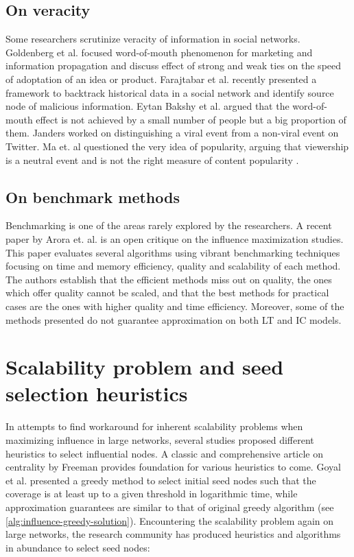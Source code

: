 		\subsection{On veracity}
		Some researchers scrutinize veracity of information in social networks. Goldenberg et al. \cite{goldenberg2001} focused word-of-mouth phenomenon for marketing and information propagation and discuss effect of strong and weak ties on the speed of adoptation of an idea or product. Farajtabar et al. \cite{farajtabar2015} recently presented a framework to backtrack historical data in a social network and identify source node of malicious information. Eytan Bakshy et al. \cite{bakshy2011} argued that the word-of-mouth effect is not achieved by a small number of people but a big proportion of them. Janders \cite{jenders2013} worked on distinguishing a viral event from a non-viral event on Twitter. Ma et. al questioned the very idea of popularity, arguing that viewership is a neutral event and is not the right measure of content popularity \cite{ma2013}.

		\subsection{On benchmark methods}
		Benchmarking is one of the areas rarely explored by the researchers. A recent paper by Arora et. al. \cite{arora2017} is an open critique on the influence maximization studies. This paper evaluates several algorithms using vibrant benchmarking techniques focusing on time and memory efficiency, quality and scalability of each method. The authors establish that the efficient methods miss out on quality, the ones which offer quality cannot be scaled, and that the best methods for practical cases are the ones with higher quality and time efficiency. Moreover, some of the methods presented do not guarantee approximation on both LT and IC models.
		
		
	\section{Scalability problem and seed selection heuristics}
	\label{sec:related-seed-selection}
	In attempts to find workaround for inherent scalability problems when maximizing influence in large networks, several studies proposed different heuristics to select influential nodes. A classic and comprehensive article on centrality by Freeman \cite{freeman1979} provides foundation for various heuristics to come. Goyal et al. \cite{goyal2012} presented a greedy method to select initial seed nodes such that the coverage is at least up to a given threshold in logarithmic time, while approximation guarantees are similar to that of original greedy algorithm (see \ref{alg:influence-greedy-solution}). Encountering the scalability problem again on large networks, the research community has produced heuristics and algorithms in abundance to select seed nodes:
	
